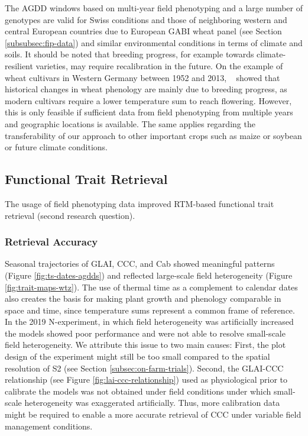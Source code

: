 The AGDD windows based on multi-year field phenotyping and a large number of genotypes are valid for Swiss conditions and those of neighboring western and central European countries due to European GABI wheat panel (see Section \ref{subsubsec:fip-data}) and similar environmental conditions in terms of climate and soils. It should be noted that breeding progress, for example towards climate-resilient varieties, may require recalibration in the future. On the example of wheat cultivars in Western Germany between 1952 and 2013, ~\cite{rezaei_climate_2018} showed that historical changes in wheat phenology are mainly due to breeding progress, as modern cultivars require a lower temperature sum to reach flowering. However, this is only feasible if sufficient data from field phenotyping from multiple years and geographic locations is available. The same applies regarding the transferability of our approach to other important crops such as maize or soybean or future climate conditions.

\subsection{Functional Trait Retrieval}
The usage of field phenotyping data improved RTM-based functional trait retrieval (second research question). 

\subsubsection{Retrieval Accuracy}
Seasonal trajectories of GLAI, CCC, and Cab showed meaningful patterns (Figure \ref{fig:ts-dates-agdds}) and reflected large-scale field heterogeneity (Figure \ref{fig:trait-maps-wtz}). The use of thermal time as a complement to calendar dates also creates the basis for making plant growth and phenology comparable in space and time, since temperature sums represent a common frame of reference. In the 2019 N-experiment, in which field heterogeneity was artificially increased the models showed poor performance and were not able to resolve small-scale field heterogeneity. We attribute this issue to two main causes: First, the plot design of the experiment might still be too small compared to the spatial resolution of S2 (see Section \ref{subsec:on-farm-trials}). Second, the GLAI-CCC relationship (see Figure \ref{fig:lai-ccc-relationship}) used as physiological prior to calibrate the models was not obtained under field conditions under which small-scale heterogeneity was exaggerated artificially. Thus, more calibration data might be required to enable a more accurate retrieval of CCC under variable field management conditions.

